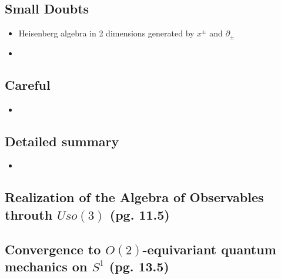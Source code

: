 \documentclass{article}
\begin{document}
\subsection*{Small Doubts}

    \begin{itemize}

    \item Heisenberg algebra in 2 dimensions generated by $x^\pm$ and $\partial_\pm$
    
    \item 
    
    \end{itemize}

\subsection*{Careful}

    \begin{itemize}

    \item 
    
    \end{itemize}

\subsection*{Detailed summary}

    \begin{itemize}

    \item 
    
    \end{itemize}

\subsection{Realization of the Algebra of Observables throuth $Uso(3)$ (pg. 11.5)}

\subsection{Convergence to $O(2)$-equivariant quantum mechanics on $S^1$ (pg. 13.5)}
\end{document}
